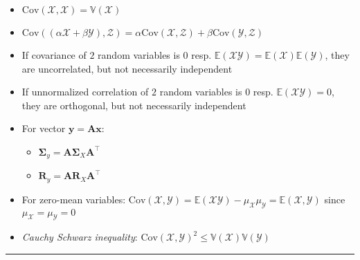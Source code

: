 \begin{itemize}
    \item $\textrm{Cov}(\mathcal{X},\mathcal{X}) = \mathbb{V}(\mathcal{X})$
    \item $\textrm{Cov}((\alpha \mathcal{X} + \beta \mathcal{Y}),\mathcal{Z}) = \alpha \textrm{Cov}(\mathcal{X},\mathcal{Z}) + \beta \textrm{Cov}(\mathcal{Y},\mathcal{Z})$
    \item If covariance of $2$ random variables is $0$ resp. $\mathbb{E}(\mathcal{X}\mathcal{Y})=\mathbb{E}(\mathcal{X})\mathbb{E}(\mathcal{Y})$, they are uncorrelated, but not necessarily independent
    \item If unnormalized correlation of $2$ random variables is $0$ resp. $\mathbb{E}(\mathcal{X}\mathcal{Y}) = 0$, they are orthogonal, but not necessarily independent 
    \item For vector $\boldsymbol{y} = \boldsymbol{A}\boldsymbol{x}$:
        \begin{itemize}
            \item $\boldsymbol{\Sigma}_y = \boldsymbol{A}\boldsymbol{\Sigma}_X\boldsymbol{A}^\intercal$
            \item $\boldsymbol{R}_y = \boldsymbol{A}\boldsymbol{R}_X\boldsymbol{A}^\intercal$
        \end{itemize}
    \item For zero-mean variables: $\textrm{Cov}(\mathcal{X},\mathcal{Y})= \mathbb{E}(\mathcal{X}\mathcal{Y}) - \mu_{\mathcal{X}} \mu_{\mathcal{Y}} = \mathbb{E}(\mathcal{X},\mathcal{Y})$ since $\mu_{\mathcal{X}} = \mu_{\mathcal{Y}} = 0$
    \item \emph{Cauchy Schwarz inequality}: $\textrm{Cov}(\mathcal{X},\mathcal{Y})^2 \leq \mathbb{V}(\mathcal{X})\mathbb{V}(\mathcal{Y})$
\end{itemize}

{\color{lightgray}\hrule height 0.001mm}

